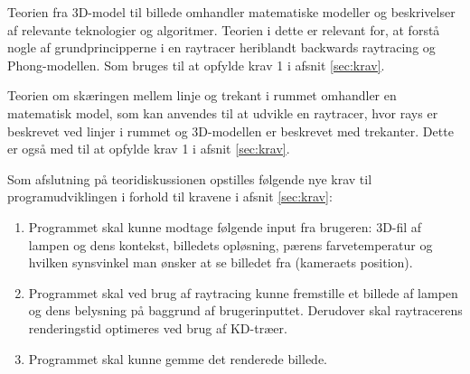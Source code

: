 Teorien fra 3D-model til billede omhandler matematiske modeller og beskrivelser af relevante teknologier og algoritmer. Teorien i dette er relevant for, at forstå nogle af grundprincipperne i en raytracer heriblandt backwards raytracing og Phong-modellen. Som bruges til at opfylde krav 1 i afsnit \ref{sec:krav}.

Teorien om skæringen mellem linje og trekant i rummet omhandler en matematisk model, som kan anvendes til at udvikle en raytracer, hvor rays er beskrevet ved linjer i rummet og 3D-modellen er beskrevet med trekanter. Dette er også med til at opfylde krav 1 i afsnit \ref{sec:krav}.

Som afslutning på teoridiskussionen opstilles følgende nye krav til programudviklingen i forhold til kravene i afsnit \ref{sec:krav}:
\begin{enumerate}
    \item Programmet skal kunne modtage følgende input fra brugeren: 3D-fil af lampen og dens kontekst, billedets opløsning, pærens farvetemperatur og hvilken synsvinkel man ønsker at se billedet fra (kameraets position).
    \item Programmet skal ved brug af raytracing kunne fremstille et billede af lampen og dens belysning på baggrund af brugerinputtet. Derudover skal raytracerens renderingstid optimeres ved brug af KD-træer.
    \item Programmet skal kunne gemme det renderede billede.
\end{enumerate}